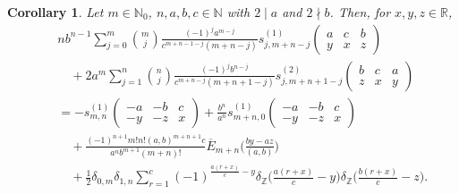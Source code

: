 \documentclass[reqno]{amsart}
\numberwithin{equation}{section}
\newtheorem{corollary}[thm]{Corollary}
\begin{document}
\begin{corollary}\label{cor2.2} Let $m\in\mathbb{N}_{0}$, $n,a,b,c\in\mathbb{N}$ with $2\mid a$ and $2\nmid b$. Then, for $x,y,z\in\mathbb{R}$,
\begin{eqnarray}\label{eq2.4}
&&nb^{n-1}\sum_{j=0}^{m}\binom{m}{j}\frac{(-1)^{j}a^{m-j}}{c^{m+n-1-j}(m+n-j)}s_{j,m+n-j}^{(1)}\left(
\begin{matrix}
a & c & b \\
y & x & z
\end{matrix}
\right)\nonumber\\
&&\quad+2a^{m}\sum_{j=1}^{n}\binom{n}{j}\frac{(-1)^{j}b^{n-j}}{c^{m+n-j}(m+n+1-j)}s_{j,m+n+1-j}^{(2)}\left(
\begin{matrix}
b & c & a \\
z & x & y
\end{matrix}
\right)\nonumber\\
&&=-s_{m,n}^{(1)}\left(
\begin{matrix}
-a & -b & c \\
-y & -z & x
\end{matrix}
\right)+\frac{b^{n}}{a^{n}}s_{m+n,0}^{(1)}\left(
\begin{matrix}
-a & -b & c \\
-y & -z & x
\end{matrix}
\right)\nonumber\\
&&\quad+\frac{(-1)^{n+1}m!n!(a,b)^{m+n+1}c}{a^{n}b^{m+1}(m+n)!}\overline{E}_{m+n}\biggl(\frac{by-az}{(a,b)}\biggl)\nonumber\\
&&\quad+\frac{1}{2}\delta_{0,m}\delta_{1,n}\sum_{r=1}^{c}(-1)^{\frac{a(r+x)}{c}-y}
\delta_{\mathbb{Z}}\biggl(\frac{a(r+x)}{c}-y\biggl)\delta_{\mathbb{Z}}\biggl(\frac{b(r+x)}{c}-z\biggl).
\end{eqnarray}
\end{corollary}
\end{document}
